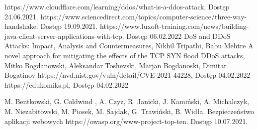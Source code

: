 \documentclass[12pt,twoside]{article}
\begin{document}
\begin{thebibliography}{4}
 https://www.cloudflare.com/learning/ddos/what-is-a-ddos-attack. Dostęp 24.06.2021.
 https://www.sciencedirect.com/topics/computer-science/three-way-handshake. Dostęp 19.09.2021.
 https://www.luxoft-training.com/news/building-java-client-server-applications-with-tcp. Dostęp 06.02.2022
 DoS and DDoS Attacks: Impact, Analysis and Countermeasures, Nikhil Tripathi, Babu Mehtre
 A novel approach for mitigating the effects of the TCP SYN flood DDoS attacks, Mitko Bogdanowski, Aleksandar Toshevski, Marjan Bogdanoski, Dimitar Bogatinov
 https://nvd.nist.gov/vuln/detail/CVE-2021-44228, Dostęp 04.02.2022
 https://edukomiks.pl, Dostęp 04.02.2022

 M. Bentkowski, G. Coldwind , A. Czyż, R. Janicki, J. Kamiński, A. Michalczyk, M. Niezabitowski, M. Piosek, M. Sajdak, G. Trawiński, B. Widła. Bezpieczeństwo aplikacji webowych
 https://owasp.org/www-project-top-ten. Dostęp 10.07.2021.

\end{thebibliography}

\clearpage

\makesummary
\end{document}
